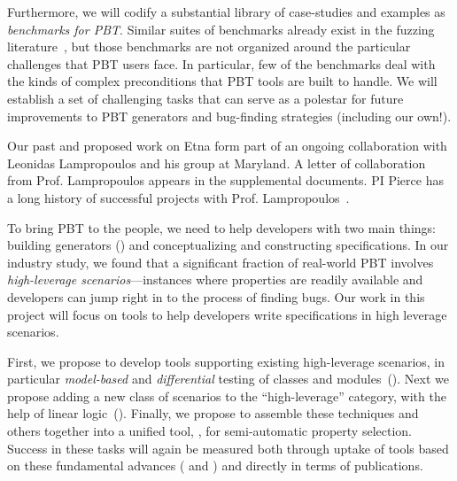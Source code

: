 Furthermore, we will codify a substantial library of case-studies and examples as
{\em benchmarks for PBT}. Similar suites of benchmarks already exist in the
fuzzing literature~\cite{hazimeh_magma_2021}, but those benchmarks are not
organized around the particular challenges that PBT users face. In particular,
few of the benchmarks deal with the kinds of complex preconditions that PBT
tools are built to handle. We will establish a set of challenging tasks that
can serve as a polestar for future improvements to PBT generators and
bug-finding strategies (including our own!).

Our past and proposed work on Etna form part of an ongoing
collaboration with Leonidas Lampropoulos and his group at Maryland.
A letter of collaboration
from Prof.{} Lampropoulos appears in the supplemental documents.
PI Pierce has a long history
of successful projects with Prof.
Lampropoulos~\cite[etc.]{beginners-luck,DBLP:conf/esop/GoldsteinHLP21,lampropoulos_coverage_2019,Lampropoulos&18,OLDlampropoulos19fuzzchick}.


%
To bring PBT to the people, we need to help developers with two main
things: building generators () and conceptualizing and constructing
specifications.
%
In our industry study, we found that a significant fraction of real-world PBT
involves {\em high-leverage scenarios}---instances where properties are
readily available and developers can jump right in to the process of finding
bugs.
%
Our work in this project will focus on tools to help developers write
specifications in high leverage scenarios.

First, we
propose to develop tools
supporting existing high-leverage scenarios, in particular {\em
model-based} and {\em differential} testing of classes and
modules~(). Next we propose
adding a new class of scenarios to the ``high-leverage'' category, with the
help of linear logic~(). Finally, we propose
to assemble these
techniques and others together into a unified tool, {\em \GhostChat}, for
semi-automatic property selection.
%
Success in these tasks will again be measured both through
uptake of
tools based on these fundamental advances ( and
) and directly in terms of publications.

